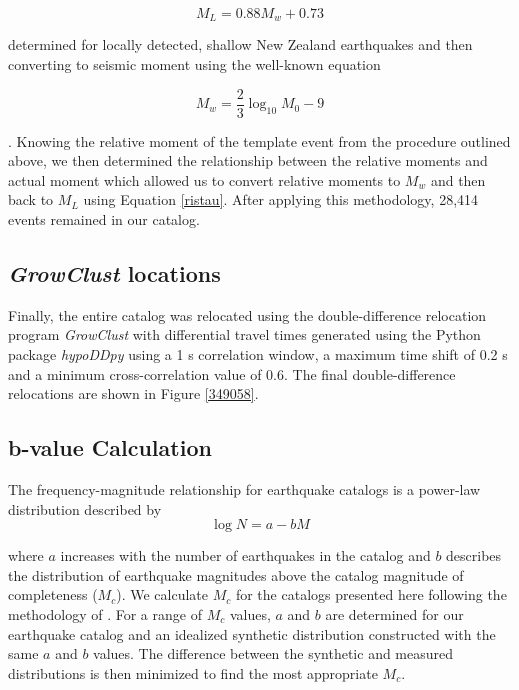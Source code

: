 \begin{equation}\label{ristau}
M_{L} = 0.88M_{w} + 0.73
\end{equation}

determined for locally detected, shallow New Zealand earthquakes \citep{Ristau_2009} and then converting to seismic moment using the well-known equation

\begin{equation}
M_w = \frac{2}{3}\log_{10}M_{0} - 9
\end{equation}

\citep{Hanks_1979}. Knowing the relative moment of the template event from the procedure outlined above, we then determined the relationship between the relative moments and actual moment which allowed us to convert relative moments to $M_w$ and then back to $M_L$ using Equation \ref{ristau}. After applying this methodology, 28,414 events remained in our catalog.

\subsection{\textit{GrowClust} locations}
Finally, the entire catalog was relocated using the double-difference relocation program \textit{GrowClust} \citep{Trugman_2017} with differential travel times generated using the Python package \textit{hypoDDpy} \citep{lion_krischer_2015_18907} using a 1 s correlation window, a maximum time shift of 0.2 s and a minimum cross-correlation value of 0.6. The final double-difference relocations are shown in Figure \ref{349058}.

\subsection{b-value Calculation}\label{b-method}
The frequency-magnitude relationship for earthquake catalogs is a power-law distribution described by 
\begin{equation}
\log{N} = a - bM
\end{equation}

\citep{gutenberg1942earthquake} where $a$ increases with the number of earthquakes in the catalog and $b$ describes the distribution of earthquake magnitudes above the catalog magnitude of completeness ($M_c$). We calculate $M_c$ for the catalogs presented here following the methodology of \citet{Wiemer_2000}. For a range of $M_c$ values, $a$ and $b$ are determined for our earthquake catalog and an idealized synthetic distribution constructed with the same $a$ and $b$ values. The difference between the synthetic and measured distributions is then minimized to find the most appropriate $M_c$.

